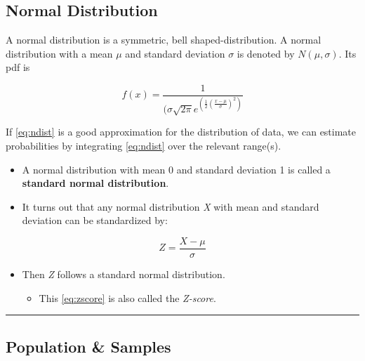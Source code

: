 \documentclass[
  openany]{book}
\providecommand{\tightlist}{%
  \setlength{\itemsep}{0pt}\setlength{\parskip}{0pt}}
\begin{document}
\subsection{Normal Distribution}\label{normal-distribution}

A normal distribution is a symmetric, bell shaped-distribution. A normal distribution with a mean \(\mu\) and standard deviation \(\sigma\) is denoted by \(N(\mu,\sigma)\). Its pdf is

\begin{equation}
  f(x)=\frac{1}{(\sigma\sqrt{2\pi}e^(\frac{1}{2}(\frac{x-\mu}{\sigma})^2)}
  \label{eq:ndist}
\end{equation}

If \eqref{eq:ndist} is a good approximation for the distribution of data, we can estimate probabilities by integrating \eqref{eq:ndist} over the relevant range(s).

\begin{itemize}
\tightlist
\item
  A normal distribution with mean 0 and standard deviation 1 is called a \textbf{standard normal distribution}.
\item
  It turns out that any normal distribution \emph{X} with mean \mu and standard deviation \sigma can be standardized by:
\end{itemize}

\begin{equation}
  Z=\frac{X-\mu}{\sigma}
  \label{eq:zscore}
\end{equation}

\begin{itemize}
\tightlist
\item
  Then \emph{Z} follows a standard normal distribution.

  \begin{itemize}
  \tightlist
  \item
    This \eqref{eq:zscore} is also called the \emph{Z-score}.
  \end{itemize}
\end{itemize}

\begin{center}\rule{0.5\linewidth}{0.5pt}\end{center}

\subsection{Population \& Samples}\label{population-samples}
\end{document}
